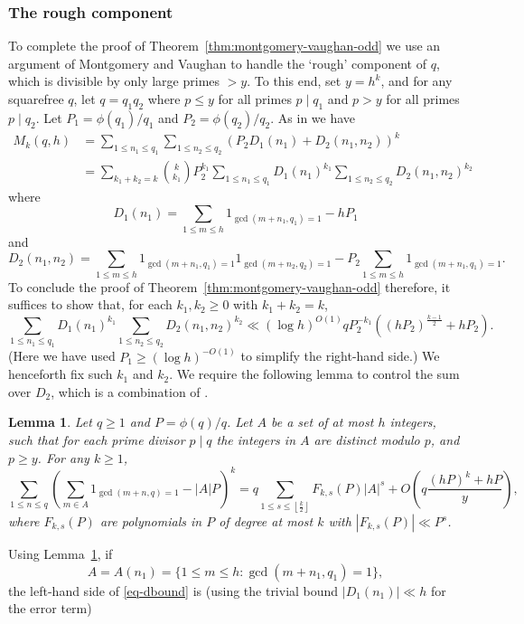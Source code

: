 \documentclass[11pt,letterpaper]{amsart}
\newcommand{\abs}[1]{\left\lvert #1\right\rvert}
\newcommand{\brac}[1]{\left( #1\right)}
\newcommand{\ogcd}[2]{\gcd(#1,#2)}
\newtheorem{lemma}{Lemma}
\theoremstyle{definition}
\begin{document}
\subsubsection{The rough component} 

To complete the proof of Theorem~\ref{thm:montgomery-vaughan-odd} we use an argument of Montgomery and Vaughan \cite{MV86} to handle the `rough' component of $q$, which is divisible by only large primes $>y$. To this end, set $y = h^k$, and for any squarefree $q$, let $q=q_1q_2$ where $p\leq y$ for all primes $p\mid q_1$ and $p>y$ for all primes $p\mid q_2$. Let $P_1=\phi(q_1)/q_1$ and $P_2=\phi(q_2)/q_2$. As in \cite[Section 7]{MV86} we have
\begin{align*}
M_k(q,h) 
&= \sum_{1\leq n_1\leq q_1}\sum_{1\leq n_2\leq q_2}(P_2D_1(n_1)+D_2(n_1,n_2))^k\\
&=\sum_{k_1+k_2=k}\binom{k}{k_1}P_2^{k_1}\sum_{1\leq n_1\leq q_1}D_1(n_1)^{k_1}\sum_{1\leq n_2\leq q_2}D_2(n_1,n_2)^{k_2}
\end{align*}
where
\[D_1(n_1) = \sum_{1\leq m\leq h}1_{\ogcd{m+n_1}{q_1}=1}-hP_1\]
and
\[D_2(n_1,n_2)=\sum_{1\leq m\leq h}1_{\ogcd{m+n_1}{q_1}=1}1_{\ogcd{m+n_2}{q_2}=1}-P_2\sum_{1\leq m\leq h}1_{\ogcd{m+n_1}{q_1}=1}.\]
To conclude the proof of Theorem~\ref{thm:montgomery-vaughan-odd} therefore, it suffices to show that, for each $k_1,k_2\geq 0$ with $k_1+k_2=k$,
\begin{equation}\label{eq-dbound}
\sum_{1\leq n_1\leq q_1}D_1(n_1)^{k_1}\sum_{1\leq n_2\leq q_2}D_2(n_1,n_2)^{k_2}\ll (\log h)^{O(1)}qP_2^{-k_1}\brac{(hP_2)^{\frac{k-1}{2}}+hP_2}.
\end{equation}
(Here we have used $P_1\geq (\log h)^{-O(1)}$ to simplify the right-hand side.) We henceforth fix such $k_1$ and $k_2$. We require the following lemma to control the sum over $D_2$, which is a combination of \cite[Lemmas 9 and 10]{MV86}. 
\begin{lemma}\label{lem-mv2}
Let $q\geq 1$ and $P=\phi(q)/q$. Let $A$ be a set of at most $h$ integers, such that for each prime divisor $p\mid q$ the integers in $A$ are distinct modulo $p$, and $p\geq y$. For any $k\geq 1$,
\[\sum_{1\leq n\leq q}\brac{\sum_{m\in A}1_{\ogcd{m+n}{q}=1}-\abs{A}P}^k = q\sum_{1\leq s\leq \left\lfloor \frac k2\right\rfloor}F_{k,s}(P)\abs{A}^s+O\brac{q\frac{(hP)^k+hP}{y}},\]
where $F_{k,s}(P)$ are polynomials in $P$ of degree at most $k$ with $\abs{F_{k,s}(P)}\ll P^s$. 
\end{lemma}
Using Lemma~\ref{lem-mv2}, if 
\[A=A(n_1)=\{1\leq m\leq h : \ogcd{m+n_1}{q_1}=1\},\]
the left-hand side of \eqref{eq-dbound} is (using the trivial bound $\abs{D_1(n_1)}\ll h$ for the error term)
\end{document}
